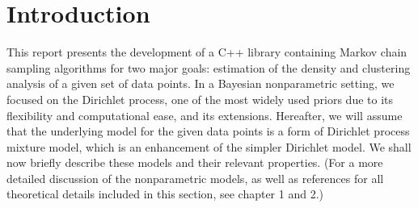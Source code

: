 \section{Introduction}
This report presents the development of a C++ library containing Markov chain sampling algorithms for two major goals: estimation of the density and clustering analysis of a given set of data points.
In a Bayesian nonparametric setting, we focused on the Dirichlet process, one of the most widely used priors due to its flexibility and computational ease, and its extensions.
Hereafter, we will assume that the underlying model for the given data points is a form of Dirichlet process mixture model, which is an enhancement of the simpler Dirichlet model.
We shall now briefly describe these models and their relevant properties.
(For a more detailed discussion of the nonparametric models, as well as references for all theoretical details included in this section, see \cite{book} chapter 1 and 2.)


